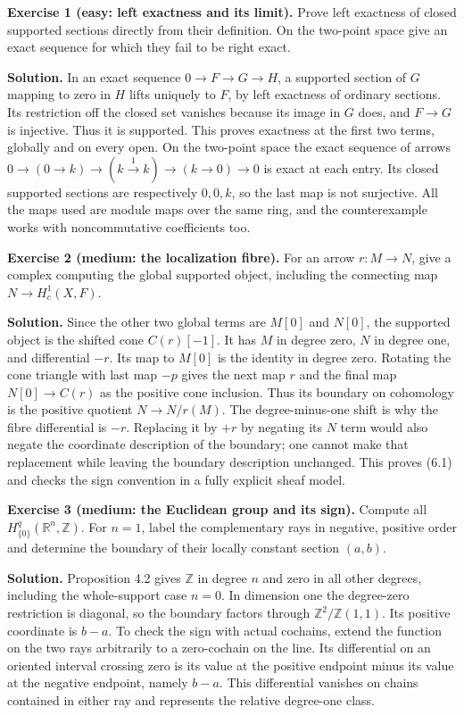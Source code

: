 \documentclass[
  english,
  11pt,
  a4paper,
]{article}
\begin{document}
\textbf{Exercise 1 (easy: left exactness and its limit).} Prove left
exactness of closed supported sections directly from their definition.
On the two-point space give an exact sequence for which they fail to be
right exact.

\textbf{Solution.} In an exact sequence \(0\to F\to G\to H\), a
supported section of \(G\) mapping to zero in \(H\) lifts uniquely to
\(F\), by left exactness of ordinary sections. Its restriction off the
closed set vanishes because its image in \(G\) does, and \(F\to G\) is
injective. Thus it is supported. This proves exactness at the first two
terms, globally and on every open. On the two-point space the exact
sequence of arrows \(0\to(0\to k)\to(k\xrightarrow{1}k)\to(k\to0)\to0\)
is exact at each entry. Its closed supported sections are respectively
\(0,0,k\), so the last map is not surjective. All the maps used are
module maps over the same ring, and the counterexample works with
noncommutative coefficients too.

\textbf{Exercise 2 (medium: the localization fibre).} For an arrow
\(r:M\to N\), give a complex computing the global supported object,
including the connecting map \(N\to H^1_c(X,F)\).

\textbf{Solution.} Since the other two global terms are \(M[0]\) and
\(N[0]\), the supported object is the shifted cone \(C(r)[-1]\). It has
\(M\) in degree zero, \(N\) in degree one, and differential \(-r\). Its
map to \(M[0]\) is the identity in degree zero. Rotating the cone
triangle with last map \(-p\) gives the next map \(r\) and the final map
\(N[0]\to C(r)\) as the positive cone inclusion. Thus its boundary on
cohomology is the positive quotient \(N\to N/r(M)\). The
degree-minus-one shift is why the fibre differential is \(-r\).
Replacing it by \(+r\) by negating its \(N\) term would also negate the
coordinate description of the boundary; one cannot make that replacement
while leaving the boundary description unchanged. This proves (6.1) and
checks the sign convention in a fully explicit sheaf model.

\textbf{Exercise 3 (medium: the Euclidean group and its sign).} Compute
all \(H^q_{\{0\}}(\mathbb R^n,\mathbb Z)\). For \(n=1\), label the
complementary rays in negative, positive order and determine the
boundary of their locally constant section \((a,b)\).

\textbf{Solution.} Proposition 4.2 gives \(\mathbb Z\) in degree \(n\)
and zero in all other degrees, including the whole-support case \(n=0\).
In dimension one the degree-zero restriction is diagonal, so the
boundary factors through \(\mathbb Z^2/\mathbb Z(1,1)\). Its positive
coordinate is \(b-a\). To check the sign with actual cochains, extend
the function on the two rays arbitrarily to a zero-cochain on the line.
Its differential on an oriented interval crossing zero is its value at
the positive endpoint minus its value at the negative endpoint, namely
\(b-a\). This differential vanishes on chains contained in either ray
and represents the relative degree-one class.
\end{document}
